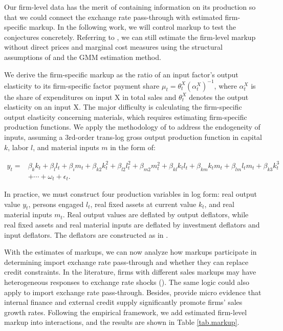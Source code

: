 \documentclass[12pt]{article}
\begin{document}
Our firm-level data has the merit of containing information on its production so that we could connect the exchange rate pass-through with estimated firm-specific markup. In the following work, we will control markup to test the conjectures concretely. Referring to \cite{bkl2021}, we can still estimate the firm-level markup without direct prices and marginal cost measures using the structural assumptions of \cite{dlw2012} and the GMM estimation method.

We derive the firm-specific markup as the ratio of an input factor's output elasticity to its firm-specific factor payment share $\mu_{t}=\theta_{t}^{X}\left(\alpha_{t}^{X}\right)^{-1}$, where $\alpha_{t}^{X}$ is the share of expenditures on input X in total sales and $\theta^X_t$ denotes the output elasticity on an input X. The major difficulty is calculating the firm-specific output elasticity concerning materials, which requires estimating firm-specific production functions. We apply the methodology of \cite{acf2015} to address the endogeneity of inputs, assuming a 3rd-order trans-log gross output production function in capital $k$, labor $l$, and material inputs $m$ in the form of:

$$
\begin{aligned}
	y_{t}= &\beta_{k} k_{t}+\beta_{l} l_{t}+\beta_{i} m_{t}+\beta_{k 2} k_{t}^{2}+\beta_{l 2} l_{t}^{2}+\beta_{m 2} m_{t}^{2}+\beta_{k l} k_{ t} l_{t}+\beta_{k m} k_{t} m_{t}+\beta_{l m} l_{t} m_{t}+\beta_{k 3} k_{t}^{3}\\
	&+\cdots+\omega_{t}+\epsilon_{t}.
\end{aligned}
$$

In practice, we must construct four production variables in log form: real output value $y_t$, persons engaged $l_t$, real fixed assets at current value $k_t$, and real material inputs $m_t$. Real output values are deflated by output deflators, while real fixed assets and real material inputs are deflated by investment deflators and input deflators. The deflators are constructed as in \cite{brandt2012}.

With the estimates of markups, we can now analyze how markups participate in determining import exchange rate pass-through and whether they can replace credit constraints. In the literature, firms with different sales markups may have heterogeneous responses to exchange rate shocks (\cite{bmm2012}). The same logic could also apply to import exchange rate pass-through. Besides, \cite{llz2018} provide micro evidence that internal finance and external credit supply significantly promote firms' sales growth rates. Following the empirical framework, we add estimated firm-level markup into interactions, and the results are shown in Table \ref{tab.markup}.
\end{document}
